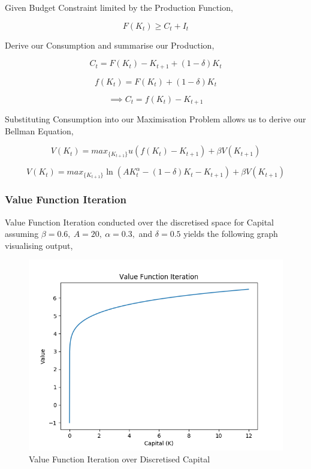 \documentclass{article}
\begin{document}
\noindent Given Budget Constraint limited by the Production Function,

\begin{equation}
F(K_t)\geq C_t + I_t
\end{equation}

\noindent Derive our Consumption and summarise our Production,

\begin{equation}
C_t = F(K_t)-K_{t+1}+(1-\delta)K_t
\end{equation}

\begin{equation}
f(K_t) = F(K_t)+(1-\delta)K_t
\end{equation}

\begin{equation}
\implies C_t=f(K_t)-K_{t+1}
\end{equation}

\noindent Substituting Consumption into our Maximisation Problem allows us to derive our Bellman Equation,

\begin{equation}
V( K_t ) = max_{ \{ K_{t+1} \} } u( f(K_t) - K_{t+1} ) + \beta V(K_{t+1})
\end{equation}

\begin{equation}
V( K_t ) = max_{ \{ K_{t+1} \} } \ln( AK^{\alpha} _t - (1-\delta)K_t - K_{t+1} ) + \beta V(K_{t+1})
\end{equation}

\newpage

\subsubsection{Value Function Iteration}

Value Function Iteration conducted over the discretised space for Capital assuming $\beta=0.6, \ A=20, \ \alpha=0.3,$ and $\delta=0.5$ yields the following graph visualising output,

\begin{figure}[h]
\begin{center}
\includegraphics[width=\textwidth]{Figure1.png}
\caption{Value Function Iteration over Discretised Capital}
\end{center}
\end{figure}
\FloatBarrier
\end{document}
